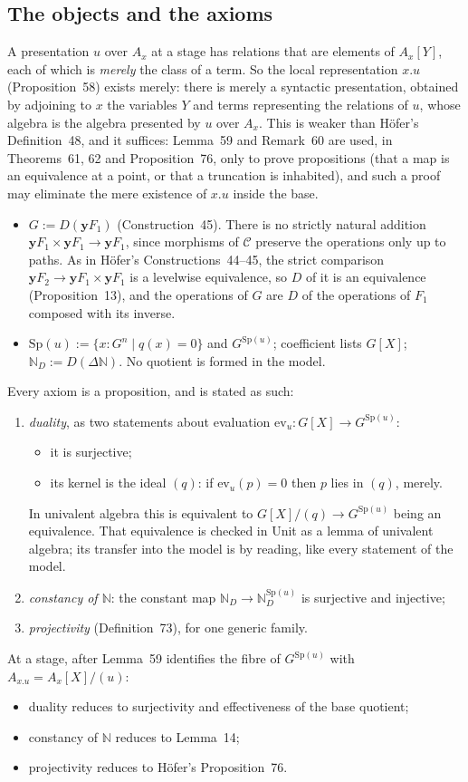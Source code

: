 \documentclass[11pt]{amsart}
\theoremstyle{definition}
\theoremstyle{remark}
\newcommand{\Sp}{\mathrm{Sp}}
\newcommand{\yo}{\mathbf{y}}
\begin{document}
\subsection{The objects and the axioms}
A presentation $u$ over $A_x$ at a stage has relations that are elements
of $A_x[Y]$, each of which is \emph{merely} the class of a term. So the
local representation $x.u$ (Proposition~58) exists merely: there is merely
a syntactic presentation, obtained by adjoining to $x$ the variables $Y$
and terms representing the relations of $u$, whose algebra is the algebra
presented by $u$ over $A_x$. This is weaker than H\"ofer's Definition~48,
and it suffices: Lemma~59 and Remark~60 are used, in Theorems~61, 62 and
Proposition~76, only to prove propositions (that a map is an equivalence at
a point, or that a truncation is inhabited), and such a proof may eliminate
the mere existence of $x.u$ inside the base.
\begin{itemize}
\item $G := D(\yo F_1)$ (Construction~45). There is no strictly natural
addition $\yo F_1\times\yo F_1\to\yo F_1$, since morphisms of $\mathcal C$
preserve the operations only up to paths. As in H\"ofer's
Constructions~44--45, the strict comparison
$\yo F_2\to\yo F_1\times\yo F_1$ is a levelwise equivalence, so $D$ of it is
an equivalence (Proposition~13), and the operations of $G$ are $D$ of the
operations of $F_1$ composed with its inverse.
\item $\Sp(u) := \{x : G^n \mid q(x)=0\}$ and $G^{\Sp(u)}$; coefficient
lists $G[X]$; $\mathbb N_D := D(\Delta\mathbb N)$. No quotient is formed
in the model.
\end{itemize}
Every axiom is a proposition, and is stated as such:
\begin{enumerate}[label=(\arabic*)]
\item \emph{duality}, as two statements about evaluation
$\mathrm{ev}_u\colon G[X]\to G^{\Sp(u)}$:
\begin{itemize}
\item it is surjective;
\item its kernel is the ideal $(q)$: if $\mathrm{ev}_u(p)=0$ then $p$ lies
in $(q)$, merely.
\end{itemize}
In univalent algebra this is equivalent to $G[X]/(q)\to G^{\Sp(u)}$ being
an equivalence. That equivalence is checked in Unit as a lemma of
univalent algebra; its transfer into the model is by reading, like every
statement of the model.
\item \emph{constancy of $\mathbb N$}: the constant map
$\mathbb N_D\to\mathbb N_D^{\Sp(u)}$ is surjective and injective;
\item \emph{projectivity} (Definition~73), for one generic family.
\end{enumerate}
At a stage, after Lemma~59 identifies the fibre of $G^{\Sp(u)}$ with
$A_{x.u}=A_x[X]/(u)$:
\begin{itemize}
\item duality reduces to surjectivity and effectiveness of the base
quotient;
\item constancy of $\mathbb N$ reduces to Lemma~14;
\item projectivity reduces to H\"ofer's Proposition~76.
\end{itemize}
\end{document}
